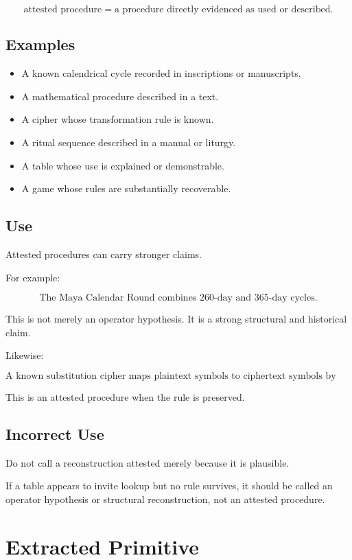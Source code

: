 \documentclass[11pt]{book}
\begin{document}
\[
\text{attested procedure} = \text{a procedure directly evidenced as used or described}.
\]

\subsection{Examples}

\begin{itemize}
    \item A known calendrical cycle recorded in inscriptions or manuscripts.
    \item A mathematical procedure described in a text.
    \item A cipher whose transformation rule is known.
    \item A ritual sequence described in a manual or liturgy.
    \item A table whose use is explained or demonstrable.
    \item A game whose rules are substantially recoverable.
\end{itemize}

\subsection{Use}

Attested procedures can carry stronger claims.

For example:

\[
\text{The Maya Calendar Round combines 260-day and 365-day cycles.}
\]

This is not merely an operator hypothesis. It is a strong structural and historical claim.

Likewise:

\[
\text{A known substitution cipher maps plaintext symbols to ciphertext symbols by rule.}
\]

This is an attested procedure when the rule is preserved.

\subsection{Incorrect Use}

Do not call a reconstruction attested merely because it is plausible.

If a table appears to invite lookup but no rule survives, it should be called an operator hypothesis or structural reconstruction, not an attested procedure.

\section{Extracted Primitive}
\end{document}
